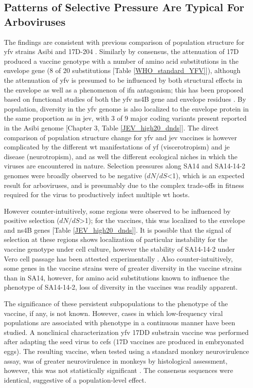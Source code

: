 \subsection{Patterns of Selective Pressure Are Typical For Arboviruses}
The findings are consistent with previous comparison of population structure for \gls{yfv} strains Asibi and 17D-204 \parencite{Beck:2014cm}. Similarly by consensus, the attenuation of 17D produced a vaccine genotype with a number of amino acid substitutions in the envelope gene (8 of 20 substitutions [Table \ref{WHO_standard_YFV}]), although the attenuation of \gls{yfv} is presumed to be influenced by both structural effects in the envelope as well as a phenomenon of \gls{ifn} antagonism; this has been proposed based on functional studies of both the \gls{yfv} \gls{ns}4B gene and envelope residues \parencite{Lee:2008gd}. By population, diversity in the \gls{yfv} genome is also localized to the envelope protein in the same proportion as in \gls{jev}, with 3 of 9 major coding variants present reported in the Asibi genome [Chapter 3, Table \ref{JEV_high20_dnds}]. The direct comparison of population structure change for \gls{yfv} and \gls{jev} vaccines is however complicated by the different \gls{wt} manifestations of \gls{yf} (viscerotropism) and \gls{je} disease (neurotropism), and as well the different ecological niches in which the viruses are encountered in nature. Selection pressures along SA14 and SA14-14-2 genomes were broadly observed to be negative ($dN/dS$<1), which is an expected result for arboviruses, and is presumably due to the complex trade-offs in fitness required for the virus to productively infect multiple \gls{wt} hosts. 

However counter-intuitively, some regions were observed to be influenced by positive selection ($dN/dS$>1); for the vaccines, this was localized to the envelope and \gls{ns}4B genes [Table \ref{JEV_high20_dnds}]. It is possible that the signal of selection at these regions shows localization of particular instability for the vaccine genotype under cell culture, however the stability of SA14-14-2 under Vero cell passage has been attested experimentally \parencite{Yang:2014io}. Also counter-intuitively, some genes in the vaccine strains were of greater diversity in the vaccine strains than in SA14, however, for amino acid substitutions known to influence the phenotype of SA14-14-2, loss of diversity in the vaccines was readily apparent. 

The significance of these persistent subpopulations to the phenotype of the vaccine, if any, is not known. However, cases in which low-frequency viral populations are associated with phenotype in a continuous manner have been studied. A nonclinical characterization \gls{yfv} 17DD substrain vaccine was performed after adapting the seed virus to \glspl{cef} (17D vaccines are produced in embryonated eggs). The resulting vaccine, when tested using a standard monkey neurovirulence assay, was of greater neurovirulence in monkeys by histological assessment, however, this was not statistically significant \parencite{Freire:2005iw}. The consensus sequences were identical, suggestive of a population-level effect.



